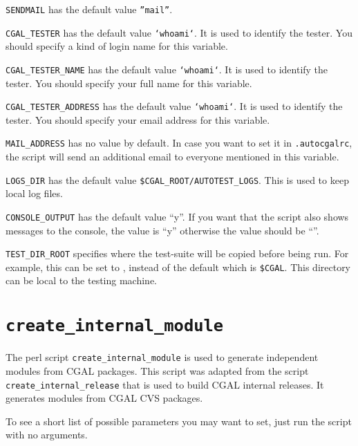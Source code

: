 {\tt SENDMAIL} has the default value {\tt ''mail''}.

{\tt CGAL\_TESTER} has the default value {\tt `whoami`}.  It is used to
identify the tester.  You should specify a kind of login name for this
variable.

{\tt CGAL\_TESTER\_NAME} has the default value {\tt `whoami`}.  It is used to
identify the tester.  You should specify your full name for this variable.

{\tt CGAL\_TESTER\_ADDRESS} has the default value {\tt `whoami`}.  It is used
to identify the tester.  You should specify your email address for this
variable.

{\tt MAIL\_ADDRESS} has no value by default. In case you want to
set it in {\tt .autocgalrc}, the script will send an additional email to
everyone mentioned in this variable.    

{\tt LOGS\_DIR} has the default value {\tt \$CGAL\_ROOT/AUTOTEST\_LOGS}.  This
is used to keep local log files.

{\tt CONSOLE\_OUTPUT} has the default value ``y''. If you want that the script
 also shows messages to the console, the value is ``y'' otherwise the value 
should be ``''.

{\tt TEST\_DIR\_ROOT} specifies where the test-suite will be copied before
being run.  For example, this can be set to , instead of the default
which is {\tt \$CGAL}.  This directory can be local to the testing machine.




\section{{\tt create\_internal\_module}}
\label{sec:create_internal_module}

The perl script {\tt create\_internal\_module} is used to generate independent
 modules from CGAL packages. This script was adapted from the script {\tt 
create\_internal\_release} that is used to build CGAL internal releases.
It generates modules from CGAL CVS packages.

To see a short list of possible parameters you may want to set, just run the 
script with no arguments.   

